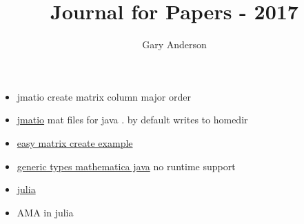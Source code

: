 \documentclass[hyperref]{labbook}
\begin{document}
\frontmatter
\title{Journal for Papers  - 2017}
\author{Gary Anderson }
\maketitle

\printindex
\tableofcontents

\mainmatter


\begin{itemize}
\item jmatio create matrix column major order
\end{itemize}

\begin{itemize}
\item \href{http://www.programcreek.com/java-api-examples/index.php?api=com.jmatio.io.MatFileReader}{jmatio}  mat files for java  .  by default writes to homedir
\item \href{http://intra.csb.ethz.ch/javadoc/metabolic/com/jmatio/io/MatFileWriter.html}{easy matrix create example}
\item \href{https://mathematica.stackexchange.com/questions/64756/creating-a-generic-empty-list-with-jlink}{generic types mathematica java}  no runtime support
\end{itemize}


\begin{itemize}
\item \href{https://github.com/JuliaInterop/Mathematica.jl}{julia}
\item AMA in julia
\end{itemize}
\end{document}
